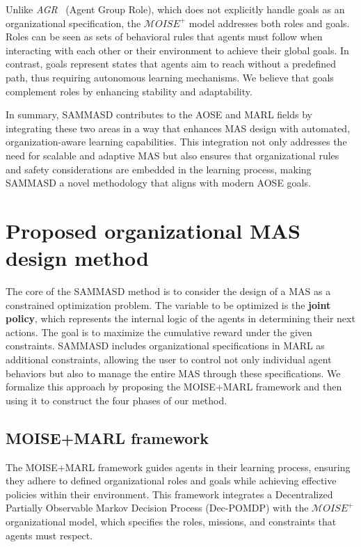 \documentclass[sigconf,anonymous]{aamas}
\begin{document}
Unlike \textit{AGR}~\cite{ferber2003} (Agent Group Role), which does not explicitly handle goals as an organizational specification, the $\mathcal{M}OISE^+$ model addresses both roles and goals. Roles can be seen as sets of behavioral rules that agents must follow when interacting with each other or their environment to achieve their global goals. In contrast, goals represent states that agents aim to reach without a predefined path, thus requiring autonomous learning mechanisms. We believe that goals complement roles by enhancing stability and adaptability.

In summary, SAMMASD contributes to the AOSE and MARL fields by integrating these two areas in a way that enhances MAS design with automated, organization-aware learning capabilities. This integration not only addresses the need for scalable and adaptive MAS but also ensures that organizational rules and safety considerations are embedded in the learning process, making SAMMASD a novel methodology that aligns with modern AOSE goals.



\section{Proposed organizational MAS design method}
\label{sec:sammasd_presentation}

The core of the SAMMASD method is to consider the design of a MAS as a constrained optimization problem. The variable to be optimized is the \textbf{joint policy}, which represents the internal logic of the agents in determining their next actions. The goal is to maximize the cumulative reward under the given constraints. SAMMASD includes organizational specifications in MARL as additional constraints, allowing the user to control not only individual agent behaviors but also to manage the entire MAS through these specifications. We formalize this approach by proposing the MOISE+MARL framework and then using it to construct the four phases of our method.

\subsection{\textbf{MOISE+MARL framework}}

The MOISE+MARL framework guides agents in their learning process, ensuring they adhere to defined organizational roles and goals while achieving effective policies within their environment. This framework integrates a Decentralized Partially Observable Markov Decision Process (Dec-POMDP) with the $\mathcal{M}OISE^+$ organizational model, which specifies the roles, missions, and constraints that agents must respect.
\end{document}
